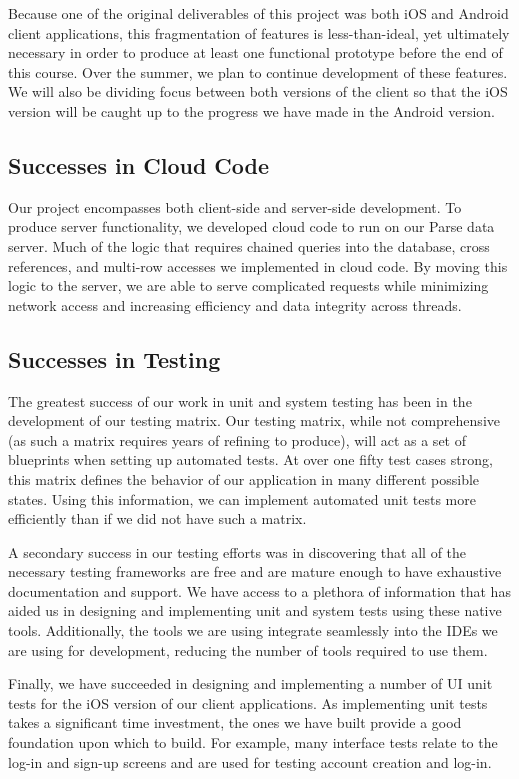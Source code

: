 Because one of the original deliverables of this project was both iOS and
Android client applications, this fragmentation of features is less-than-ideal,
yet ultimately necessary in order to produce at least one functional prototype
before the end of this course. Over the summer, we plan to continue development
of these features. We will also be dividing focus between both versions of the
client so that the iOS version will be caught up to the progress we have made in
the Android version.


\subsection{Successes in Cloud Code}

Our project encompasses both client-side and server-side development. To produce
server functionality, we developed cloud code to run on our Parse data server.
Much of the logic that requires chained queries into the database, cross
references, and multi-row accesses we implemented in cloud code. By moving this
logic to the server, we are able to serve complicated requests while minimizing
network access and increasing efficiency and data integrity across threads.


\subsection{Successes in Testing}

The greatest success of our work in unit and system testing has been in the
development of our testing matrix. Our testing matrix, while not comprehensive
(as such a matrix requires years of refining to produce), will act as a set of
blueprints when setting up automated tests. At over one fifty test cases
strong, this matrix defines the behavior of our application in many different
possible states. Using this information, we can implement automated unit tests
more efficiently than if we did not have such a matrix.

A secondary success in our testing efforts was in discovering that all of the
necessary testing frameworks are free and are mature enough to have exhaustive
documentation and support. We have access to a plethora of information that has
aided us in designing and implementing unit and system tests using these native
tools. Additionally, the tools we are using integrate seamlessly into the IDEs we
are using for development, reducing the number of tools required to use them.

Finally, we have succeeded in designing and implementing a number of UI unit
tests for the iOS version of our client applications. As implementing unit tests
takes a significant time investment, the ones we have built provide a good
foundation upon which to build. For example, many interface tests relate to the
log-in and sign-up screens and are used for testing account creation and log-in.


